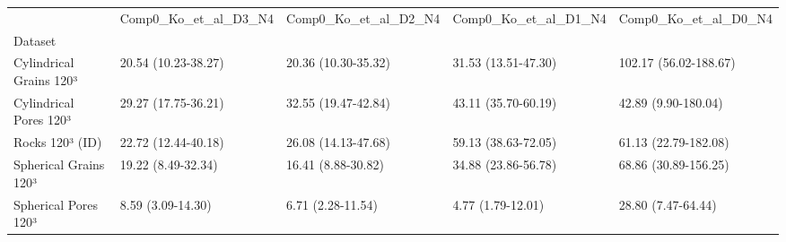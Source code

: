 \begin{tabular}{lllll}
\toprule
 & Comp0_Ko_et_al_D3_N4 & Comp0_Ko_et_al_D2_N4 & Comp0_Ko_et_al_D1_N4 & Comp0_Ko_et_al_D0_N4 \\
Dataset &  &  &  &  \\
\midrule
Cylindrical Grains 120³ & 20.54 (10.23-38.27) & 20.36 (10.30-35.32) & 31.53 (13.51-47.30) & 102.17 (56.02-188.67) \\
Cylindrical Pores 120³ & 29.27 (17.75-36.21) & 32.55 (19.47-42.84) & 43.11 (35.70-60.19) & 42.89 (9.90-180.04) \\
Rocks 120³ (ID) & 22.72 (12.44-40.18) & 26.08 (14.13-47.68) & 59.13 (38.63-72.05) & 61.13 (22.79-182.08) \\
Spherical Grains 120³ & 19.22 (8.49-32.34) & 16.41 (8.88-30.82) & 34.88 (23.86-56.78) & 68.86 (30.89-156.25) \\
Spherical Pores 120³ & 8.59 (3.09-14.30) & 6.71 (2.28-11.54) & 4.77 (1.79-12.01) & 28.80 (7.47-64.44) \\
\bottomrule
\end{tabular}
